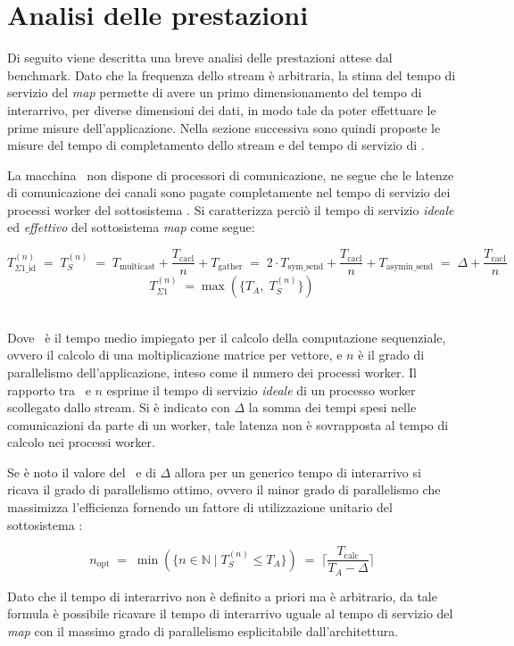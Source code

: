 \section{Analisi delle prestazioni}
Di seguito viene descritta una breve analisi delle prestazioni attese dal benchmark. Dato che la frequenza dello stream \`e arbitraria, la stima del tempo di servizio del \emph{map} permette di avere un primo dimensionamento del tempo di interarrivo, per diverse dimensioni dei dati, in modo tale da poter effettuare le prime misure dell'applicazione. Nella sezione successiva sono quindi proposte le misure del tempo di completamento dello stream e del tempo di servizio di \subsystem.

La macchina \tile\ non dispone di processori di comunicazione, ne segue che le latenze di comunicazione dei canali sono pagate completamente nel tempo di servizio dei processi worker del sottosistema \subsystem. Si caratterizza perci\`o il tempo di servizio \emph{ideale} ed \emph{effettivo} del sottosistema \emph{map} come segue:
\begin{fleqn}[0pt]
\[ T_{\Sigma1\_\textrm{id}}^{(n)} \; = \; T_S^{(n)} \; = \; T_{\textrm{multicast}} + \frac{T_{\textrm{cacl}}}{n} + T_{\textrm{gather}} \; = \; 2 \cdot T_{\textrm{sym\_send}} + \frac{T_{\textrm{cacl}}}{n} + T_{\textrm{asymin\_send}} \; = \; \Delta + \frac{T_{\textrm{cacl}}}{n} \]
\[ T_{\Sigma1}^{(n)} \; = \max(\{ T_A , \; T_S^{(n)} \}) \]
\end{fleqn}
\\
Dove \Tcalc\ \`e il tempo medio impiegato per il calcolo della computazione sequenziale, ovvero il calcolo di una moltiplicazione matrice per vettore, e $n$ \`e il grado di parallelismo dell'applicazione, inteso come il numero dei processi worker. Il rapporto tra \Tcalc\ e $n$ esprime il tempo di servizio \emph{ideale} di un processo worker scollegato dallo stream. Si \`e indicato con $\Delta$ la somma dei tempi spesi nelle comunicazioni da parte di un worker, tale latenza non \`e sovrapposta al tempo di calcolo nei processi worker. 

Se \`e noto il valore del \Tcalc\ e di $\Delta$ allora per un generico tempo di interarrivo si ricava il grado di parallelismo ottimo, ovvero il minor grado di parallelismo che massimizza l'efficienza fornendo un fattore di utilizzazione unitario del sottosistema \subsystem:
\begin{fleqn}[0pt]
\[ n_{\textrm{opt}} \; = \; \min(\{ n \in \mathbb{N} \; | \; T_S^{(n)} \le T_A \}) \; = \; \Bigg\lceil \frac{ T_{\textrm{calc}}}{T_A - \Delta} \Bigg\rceil  \]
\end{fleqn}
Dato che il tempo di interarrivo non \`e definito a priori ma \`e arbitrario, da tale formula \`e possibile ricavare il tempo di interarrivo uguale al tempo di servizio del \emph{map} con il massimo grado di parallelismo esplicitabile dall'architettura.


